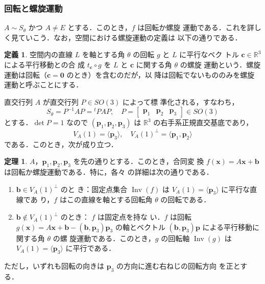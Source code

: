 \documentclass[11pt, uplatex, dvipdfmx, titlepage]{jsarticle}
\DeclareMathOperator{\Inv}{Inv}
\theoremstyle{definition}
\newtheorem{theorem}{定理}[section]
\newtheorem*{definition}{定義}
\begin{document}
\subsubsection{回転と螺旋運動}\label{sec:RotSpiral3}

$A \sim S_{\theta}$ かつ $A \neq E$ とする．このとき，$f$ は回転か螺旋
運動である．これを詳しく見ていこう．なお，空間における螺旋運動の定義は
以下の通りである．

\begin{definition}
  空間内の直線 $L$ を軸とする角 $\theta$ の回転 $g$ と $L$ に平行なベク
  トル $\bm{c} \in \mathbb{R}^3$ による平行移動との合
  成 $t_{\bm{c}}\circ g$ を $L$ と $\bm{c}$ に関する角 $\theta$ の螺旋
  運動という．螺旋運動は回転（$\bm{c}=\bm{0}$ のとき）を含むのだが，以
  降は回転でないもののみを螺旋運動と呼ぶことにする．
\end{definition}


直交行列 $A$ が直交行列 $P \in SO(3)$ によって標
準化される，すなわち，
\[
  S_{\theta} = P^{-1}AP = {}^{t}P A P, \quad P=\left[
    \begin{array}{ccc}
      \bm{p}_1 & \bm{p}_2 & \bm{p}_3
    \end{array}
  \right] \in SO(3)
\]
とする．$\det P=1$ なので $\left( \bm{p}_1, \bm{p}_2, \bm{p}_3\right)$
は $\mathbb{R}^3$ の右手系正規直交基底であり，
\[
  V_A(1)= \langle \bm{p}_3 \rangle, \quad V_A(1)^{\perp} = \langle \bm{p}_1, \bm{p}_2 \rangle
\]
である．このとき，次が成り立つ．

\begin{theorem}\label{thm:RotOrSpiral3}
  $A，\bm{p}_1, \bm{p}_2, \bm{p}_3$ を先の通りとする．このとき，合同変
  換 $f(\bm{x}) = A\bm{x} + \bm{b}$ は回転か螺旋運動である．特に，各々
  の詳細は次の通りである．
  \begin{enumerate}[(1)]
  \item $\bm{b} \in V_A(1)^{\perp}$ のと
    き：固定点集合 $\Inv(f)$ は $V_A(1)=\langle \bm{p}_3\rangle$ に平行な直線であ
    り，$f$ はこの直線を軸とする回転角 $\theta$ の回転である．
    
  \item $\bm{b} \not\in V_A(1)^{\perp}$ のとき： $f$ は固定点を持な
    い．$f$ は回転 $g(\bm{x}) = A\bm{x} +
    \bm{b}-(\bm{b},\bm{p}_3)\bm{p}_3$ の軸とベクトル
    $(\bm{b}, \bm{p}_3)\bm{p}$ による平行移動に関する角 $\theta$ の螺
    旋運動である．このとき，$g$ の回転軸 $\Inv(g)$ は $V_A(1)=\langle
    \bm{p}_3 \rangle$ に平行である．
  \end{enumerate}
  ただし，いずれも回転の向きは $\bm{p}_3$ の方向に進む右ねじの回転方向
  を正とする．
\end{theorem}
\end{document}
